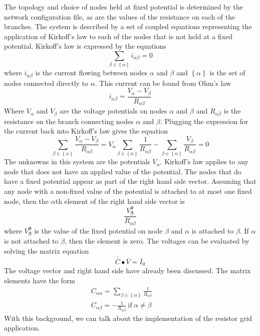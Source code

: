 \documentclass[12pt]{report} %
\begin{document}


The topology and choice of nodes held at fixed potential is determined by the network configuration file, as are the values of the resistance on each of the branches. The system is described by a set of coupled equations representing the application of Kirkoff's law to each of the nodes that is not held at a fixed potential. Kirkoff's law is expressed by the equations\[\sum_{\beta \in \left\{\alpha \right\}}{i_{\alpha \beta }=0}\] 
where $i_{\alpha \beta }$ is the current flowing between nodes $\alpha $ and $\beta $ and $\left\{\alpha \right\}$ is the set of nodes connected directly to $\alpha $. This current can be found from Ohm's law
\[i_{\alpha \beta }=\frac{V_{\alpha }-V_{\beta }}{R_{\alpha \beta }}\] 
Where $V_{\alpha }$ and $V_{\beta }$ are the voltage potentials on nodes $\alpha $ and $\beta $ and $R_{\alpha \beta }$ is the resistance on the branch connecting nodes $\alpha $ and $\beta $. Plugging the expression for the current back into Kirkoff's law gives the equation
\[\sum_{\beta \in \left\{\alpha \right\}}{\frac{V_{\alpha }-V_{\beta }}{R_{\alpha \beta }}=V_{\alpha }\sum_{\beta \in \left\{\alpha \right\}}{\frac{1}{R_{\alpha \beta }}}-\sum_{\beta \in \left\{\alpha \right\}}{\frac{V_{\beta }}{R_{\alpha \beta }}}=0}\] 
The unknowns in this system are the potentials $V_{\alpha }$. Kirkoff's law applies to any node that does not have an applied value of the potential. The nodes that do have a fixed potential appear as part of the right hand side vector. Assuming that any node with a non-fixed value of the potential is attached to at most one fixed node, then the $\alpha $th element of the right hand side vector is
\[\frac{V^{\boldsymbol{0}}_{\boldsymbol{\beta }}}{R_{\alpha \beta }}\] 
where $V^{\boldsymbol{0}}_{\boldsymbol{\beta }}$ is the value of the fixed potential on node $\beta $ and $\alpha $ is attached to $\beta $. If $\alpha $ is not attached to $\beta $, then the element is zero. The voltages can be evaluated by solving the matrix equation
\[\overline{\overline{C}}\bullet \overline{V}={\overline{I}}_0\] 
The voltage vector and right hand side have already been discussed. The matrix elements have the form
\[ \begin{array}{c}
C_{\alpha \alpha }=\sum_{\beta \in \left\{\alpha \right\}}{\frac{1}{R_{\alpha \beta }}\ \ \ \ \ \ \ \ \ \ \ } \\ 
C_{\alpha \beta }=-\frac{1}{R_{\alpha \beta }}\ \mathrm{if}\ \alpha \neq \beta  \end{array}
\] 
With this background, we can talk about the implementation of the resistor grid application.
\end{document}
